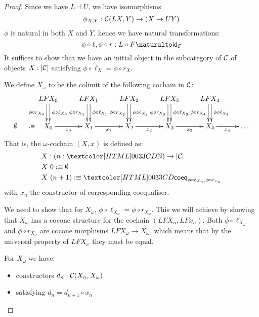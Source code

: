 \begin{proof}
  Since we have $L \dashv U$, we have isomorphisms
  $$
  \phi_{X,Y} : \mathcal{C}(L X , Y) \to (X \to U Y)
  $$
  $\phi$ is natural in both $X$ and $Y$, hence we have natural
  transformations:
  $$
  \phi \circ \ell , \phi \circ r : \Nat{L \circ F}{\id_{\Cc}}
  $$
  It suffices to show that we have an initial object in the
  subcategory of $\mathcal{C}$ of objects $X : | \mathcal{C} |$ satisfying
  $\phi \circ \ell_X = \phi \circ r_X$.

  We define $X_\omega$ to be the colimit of the following cochain in $\mathcal{C}$:
  $$
  \xymatrix{
    &LF X_0
    \ar@<.5ex>[d]^{\phi \circ \ell_{X_0}}
    \ar@<-.5ex>[d]_{\phi \circ r_{X_0}}
    &LF X_1
    \ar@<.5ex>[d]^{\phi \circ \ell_{X_1}}
    \ar@<-.5ex>[d]_{\phi \circ r_{X_1}}
    &LF X_2 
    \ar@<.5ex>[d]^{\phi \circ \ell_{X_2}}
    \ar@<-.5ex>[d]_{\phi \circ r_{X_2}}
    &LF X_3
    \ar@<.5ex>[d]^{\phi \circ \ell_{X_3}}
    \ar@<-.5ex>[d]_{\phi \circ r_{X_3}}
    &LF X_4
    \ar@<.5ex>[d]^{\phi \circ \ell_{X_4}}
    \ar@<-.5ex>[d]_{\phi \circ r_{X_4}}
    \\
    \initobj \ar@{}[r]|{\ddefeq} 
    &X_0
    \ar[r]_{x_0}
    &X_1
    \ar[r]_{x_1}
    &X_2 
    \ar[r]_{x_2}
    &X_3
    \ar[r]_{x_3}
    &X_4
    \ar[r]_{x_4}
    &\hdots
    }
  $$
  That is, the $\omega$-cochain $(X,x)$ is defined as:
  \begin{align*}
    &X : (n : \natty) \to | \Cc | \\
    &X\ 0 \ddefeq \initobj \\
    &X\ (n+1) \ddefeq \coeqty{\phi \circ \ell_{X_n}}{\phi \circ r_{x_n}}
  \end{align*}
  with $x_{n}$ the constructor of corresponding coequaliser.

  We need to show that for $X_\omega$,
  $\phi \circ \ell_{X_\omega} = \phi \circ r_{X_\omega}$. This we will
  achieve by showing that $X_\omega$ has a cocone structure for the
  cochain $(LFX_n, LFx_n)$. Both $\phi \circ \ell_{X_\omega}$ and
  $\phi \circ r_{X_\omega}$ are cocone morphisms
  $LF X_\omega \to X_\omega$, which means that by the universal
  property of $LF X_\omega$ they must be equal.

  For $X_\omega$ we have:
  \begin{itemize}
  \item constructors $d_n : \mathcal{C}(X_n, X_\omega)$
  \item satisfying $d_n = d_{n+1} \circ x_n$
  \end{itemize}


\end{proof}
